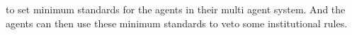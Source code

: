\documentclass[a4paper]{article}
\begin{document}
to set minimum standards for the agents in their multi agent system. And the agents can then use these minimum standards to 
veto some institutional rules. 

\end{document}
